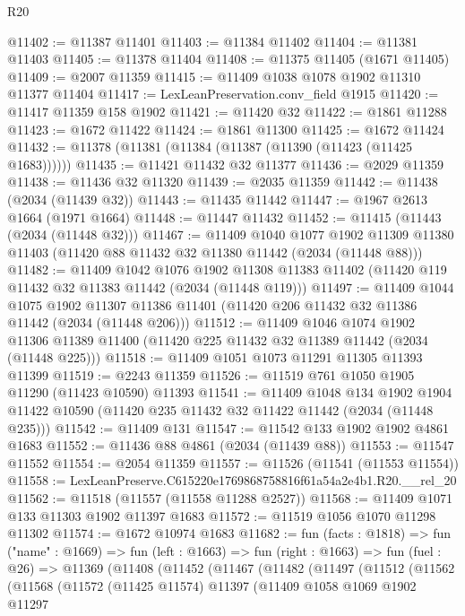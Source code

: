 \begin{lexlean}{R20}
\begin{coremodule}
@11402 := @11387 @11401
@11403 := @11384 @11402
@11404 := @11381 @11403
@11405 := @11378 @11404
@11408 := @11375 @11405 (@1671 @11405)
@11409 := @2007 @11359
@11415 := @11409 @1038 @1078 @1902 @11310 @11377 @11404
@11417 := LexLeanPreservation.conv_field @1915
@11420 := @11417 @11359 @158 @1902
@11421 := @11420 @32
@11422 := @1861 @11288
@11423 := @1672 @11422
@11424 := @1861 @11300
@11425 := @1672 @11424
@11432 := @11378 (@11381 (@11384 (@11387 (@11390 (@11423 (@11425 @1683))))))
@11435 := @11421 @11432 @32 @11377
@11436 := @2029 @11359
@11438 := @11436 @32 @11320
@11439 := @2035 @11359
@11442 := @11438 (@2034 (@11439 @32))
@11443 := @11435 @11442
@11447 := @1967 @2613 @1664 (@1971 @1664)
@11448 := @11447 @11432
@11452 := @11415 (@11443 (@2034 (@11448 @32)))
@11467 := @11409
    @1040
    @1077
    @1902
    @11309
    @11380
    @11403
    (@11420 @88 @11432 @32 @11380 @11442 (@2034 (@11448 @88)))
@11482 := @11409
    @1042
    @1076
    @1902
    @11308
    @11383
    @11402
    (@11420 @119 @11432 @32 @11383 @11442 (@2034 (@11448 @119)))
@11497 := @11409
    @1044
    @1075
    @1902
    @11307
    @11386
    @11401
    (@11420 @206 @11432 @32 @11386 @11442 (@2034 (@11448 @206)))
@11512 := @11409
    @1046
    @1074
    @1902
    @11306
    @11389
    @11400
    (@11420 @225 @11432 @32 @11389 @11442 (@2034 (@11448 @225)))
@11518 := @11409 @1051 @1073 @11291 @11305 @11393 @11399
@11519 := @2243 @11359
@11526 := @11519 @761 @1050 @1905 @11290 (@11423 @10590) @11393
@11541 := @11409
    @1048
    @134
    @1902
    @1904
    @11422
    @10590
    (@11420 @235 @11432 @32 @11422 @11442 (@2034 (@11448 @235)))
@11542 := @11409 @131
@11547 := @11542 @133 @1902 @1902 @4861 @1683
@11552 := @11436 @88 @4861 (@2034 (@11439 @88))
@11553 := @11547 @11552
@11554 := @2054 @11359
@11557 := @11526 (@11541 (@11553 @11554))
@11558 := LexLeanPreserve.C615220e1769868758816f61a54a2e4b1.R20.__rel_20
@11562 := @11518 (@11557 (@11558 @11288 @2527))
@11568 := @11409 @1071 @133 @11303 @1902 @11397 @1683
@11572 := @11519 @1056 @1070 @11298 @11302
@11574 := @1672 @10974 @1683
@11682 := fun (facts : @1818) =>
  fun ("name" : @1669) =>
  fun (left : @1663) =>
  fun (right : @1663) =>
  fun (fuel : @26) =>
  @11369
    (@11408
      (@11452
        (@11467
          (@11482
            (@11497
              (@11512
                (@11562
                  (@11568
                    (@11572
                      (@11425 @11574)
                      @11397
                      (@11409
                        @1058
                        @1069
                        @1902
                        @11297

\end{coremodule}
\end{lexlean}
